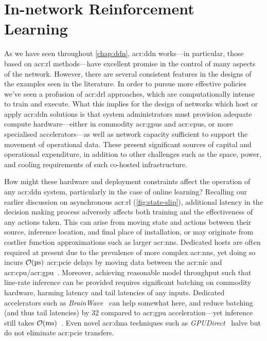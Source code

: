 \chapter{In-network Reinforcement Learning}\label{chap:in-net-rl}
As we have seen throughout \cref{chap:ddn}, \gls{acr:ddn} works---in particular, those based on \gls{acr:rl} methods---have excellent promise in the control of many aspects of the network.
However, there are several consistent features in the designs of the examples seen in the literature.
In order to pursue more effective policies we've seen a profusion of \gls{acr:drl} approaches, which are computationally intense to train and execute.
What this implies for the design of networks which host or apply \gls{acr:ddn} solutions is that system administrators must provision adequate compute hardware---either in commodity \glspl{acr:gpu} and \glspl{acr:cpu}, or more specialised accelerators---as well as network capacity sufficient to support the movement of operational data.
These present significant sources of capital and operational expenditure, in addition to other challenges such as the space, power, and cooling requirements of such co-hosted infrastructure.

How might these hardware and deployment constraints affect the operation of any \gls{acr:ddn} system, particularly in the case of online learning?
Recalling our earlier discussion on asynchronous \gls{acr:rl} (\cref{fig:state-slip}), additional latency in the decision making process adversely affects both training and the effectiveness of any actions taken.
This can arise from moving state and actions between their source, inference location, and final place of installation, or may originate from costlier function approximations such as larger \glspl{acr:nn}.
Dedicated hosts are often required at present due to the prevalence of more complex \glspl{acr:nn}, yet doing so incurs $\mathcal{O}{\left(\text{\si{\micro\second}}\right)}$ \gls{acr:pcie} delays by moving data between the \gls{acr:nic} and \gls{acr:cpu}/\gls{acr:gpu}~\parencite{DBLP:journals/corr/abs-2009-02353,DBLP:conf/sigcomm/NeugebauerAZAL018}.
Moreover, achieving reasonable model throughput such that line-rate inference can be provided requires significant batching on commodity hardware, harming latency and tail latencies of any inputs.
Dedicated accelerators such as \emph{BrainWave}~\parencite{DBLP:conf/isca/FowersOPMLLAHAG18} can help somewhat here, and reduce batching (and thus tail latencies) by \qty{32}{\texttimes} compared to \gls{acr:gpu} acceleration---yet inference still takes $\mathcal{O}{\left(\text{\si{\milli\second}}\right)}$~\parencite{Duarte2019}.
Even novel \gls{acr:dma} techniques such as \emph{GPUDirect}~\parencite{gpudirect} halve but do not eliminate \gls{acr:pcie} transfers.

